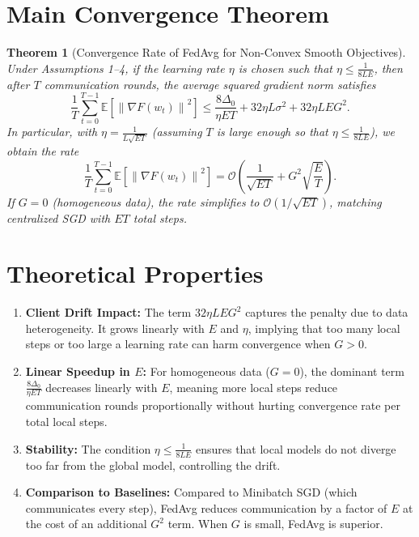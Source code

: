 \documentclass{article}
\newtheorem{theorem}{Theorem}
\newcommand{\norm}[1]{\left\| #1 \right\|}
\begin{document}
\section*{Main Convergence Theorem}
\begin{theorem}[Convergence Rate of FedAvg for Non-Convex Smooth Objectives]
Under Assumptions 1--4, if the learning rate $\eta$ is chosen such that $\eta \le \frac{1}{8LE}$, then after $T$ communication rounds, the average squared gradient norm satisfies
\begin{equation}
    \frac{1}{T} \sum_{t=0}^{T-1} \mathbb{E} \left[ \norm{\nabla F(w_t)}^2 \right] \le \frac{8\Delta_0}{\eta E T} + 32\eta L \sigma^2 + 32\eta L E G^2.
\end{equation}
In particular, with $\eta = \frac{1}{L\sqrt{E T}}$ (assuming $T$ is large enough so that $\eta \le \frac{1}{8LE}$), we obtain the rate
\begin{equation}
    \frac{1}{T} \sum_{t=0}^{T-1} \mathbb{E} \left[ \norm{\nabla F(w_t)}^2 \right] = \mathcal{O} \left( \frac{1}{\sqrt{E T}} + G^2 \sqrt{\frac{E}{T}} \right).
\end{equation}
If $G=0$ (homogeneous data), the rate simplifies to $\mathcal{O}(1/\sqrt{ET})$, matching centralized SGD with $ET$ total steps.
\end{theorem}

\section*{Theoretical Properties}
\begin{enumerate}
    \item \textbf{Client Drift Impact:} The term $32\eta L E G^2$ captures the penalty due to data heterogeneity. It grows linearly with $E$ and $\eta$, implying that too many local steps or too large a learning rate can harm convergence when $G>0$.
    \item \textbf{Linear Speedup in $E$:} For homogeneous data ($G=0$), the dominant term $\frac{8\Delta_0}{\eta E T}$ decreases linearly with $E$, meaning more local steps reduce communication rounds proportionally without hurting convergence rate per total local steps.
    \item \textbf{Stability:} The condition $\eta \le \frac{1}{8LE}$ ensures that local models do not diverge too far from the global model, controlling the drift.
    \item \textbf{Comparison to Baselines:} Compared to Minibatch SGD (which communicates every step), FedAvg reduces communication by a factor of $E$ at the cost of an additional $G^2$ term. When $G$ is small, FedAvg is superior.
\end{enumerate}
\end{document}
